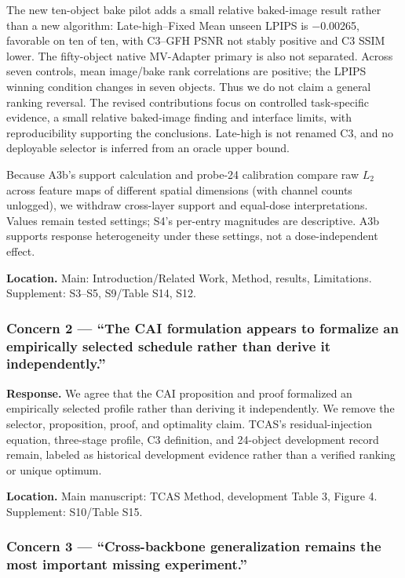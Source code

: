 \documentclass[
  10pt,
]{article}
\begin{document}
The new ten-object bake pilot adds a small relative baked-image result
rather than a new algorithm: Late-high--Fixed Mean unseen LPIPS is
−0.00265, favorable on ten of ten, with C3--GFH PSNR not stably positive
and C3 SSIM lower. The fifty-object native MV-Adapter primary is also
not separated. Across seven controls, mean image/bake rank correlations
are positive; the LPIPS winning condition changes in seven objects. Thus
we do not claim a general ranking reversal. The revised contributions
focus on controlled task-specific evidence, a small relative baked-image
finding and interface limits, with reproducibility supporting the
conclusions. Late-high is not renamed C3, and no deployable selector is
inferred from an oracle upper bound.

Because A3b's support calculation and probe-24 calibration compare raw
\(L_2\) across feature maps of different spatial dimensions (with
channel counts unlogged), we withdraw cross-layer support and equal-dose
interpretations. Values remain tested settings; S4's per-entry
magnitudes are descriptive. A3b supports response heterogeneity under
these settings, not a dose-independent effect.

\textbf{Location.} Main: Introduction/Related Work, Method, results,
Limitations. Supplement: S3--S5, S9/Table S14, S12.

\hypertarget{concern-2-the-cai-formulation-appears-to-formalize-an-empirically-selected-schedule-rather-than-derive-it-independently.}{%
\subsubsection{Concern 2 --- ``The CAI formulation appears to formalize
an empirically selected schedule rather than derive it
independently.''}\label{concern-2-the-cai-formulation-appears-to-formalize-an-empirically-selected-schedule-rather-than-derive-it-independently.}}

\textbf{Response.} We agree that the CAI proposition and proof
formalized an empirically selected profile rather than deriving it
independently. We remove the selector, proposition, proof, and
optimality claim. TCAS's residual-injection equation, three-stage
profile, C3 definition, and 24-object development record remain, labeled
as historical development evidence rather than a verified ranking or
unique optimum.

\textbf{Location.} Main manuscript: TCAS Method, development Table 3,
Figure 4. Supplement: S10/Table S15.

\hypertarget{concern-3-cross-backbone-generalization-remains-the-most-important-missing-experiment.}{%
\subsubsection{Concern 3 --- ``Cross-backbone generalization remains the
most important missing
experiment.''}\label{concern-3-cross-backbone-generalization-remains-the-most-important-missing-experiment.}}
\end{document}
